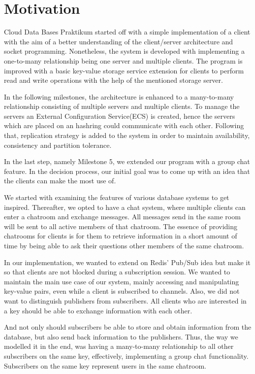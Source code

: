 \section{Motivation}
\label{sec:motivation}

Cloud Data Bases Praktikum started off with a simple implementation of a client with the aim of a better understanding of the client/server architecture and socket programming. Nonetheless, the system is developed with implementing a one-to-many relationship being one server and multiple clients. The program is improved with a basic key-value storage service extension for clients to perform read and write operations with the help of the mentioned storage server. 

In the following milestones, the architecture is enhanced to a many-to-many relationship consisting of multiple servers and multiple clients. To manage the servers an External Configuration Service(ECS) is created, hence the servers which are placed on an hashring could communicate with each other. Following that, replication strategy is added to the system in order to maintain availability, consistency and partition tolerance. 

In the last step, namely Milestone 5, we extended our program with a group chat feature. In the decision process, our initial goal was to come up with an idea that the clients can make the most use of.

We started with examining the features of various database systems to get inspired. Thereafter, we opted to have a chat system, where multiple clients can enter a chatroom and exchange messages. All messages send in the same room will be sent to all active members of that chatroom. The essence of providing chatrooms for clients is for them to retrieve information in a short amount of time by being able to ask their questions other members of the same chatroom. 

In our implementation, we wanted to extend on Redis’ Pub/Sub
idea but make it so that clients are not blocked during a subscription session. We wanted to maintain the main use case of our system, mainly accessing and manipulating key-value pairs, even while a client is subscribed to channels. Also, we did not want to distinguish publishers from subscribers. All clients who are interested in a key should be able to exchange information with each other.

And not only should subscribers be able to store and obtain
information from the database, but also send back information
to the publishers. Thus, the way we modelled it in the end, was
having a many-to-many relationship to all other subscribers on
the same key, effectively, implementing a group chat functionality. Subscribers on the same key represent users in the same chatroom.

